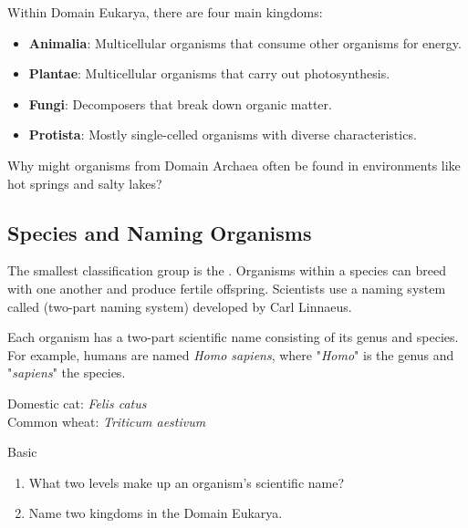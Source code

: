 Within Domain Eukarya, there are four main kingdoms:

\begin{itemize}
    \item \textbf{Animalia}: Multicellular organisms that consume other organisms for energy.
    \item \textbf{Plantae}: Multicellular organisms that carry out photosynthesis.
    \item \textbf{Fungi}: Decomposers that break down organic matter.
    \item \textbf{Protista}: Mostly single-celled organisms with diverse characteristics.
\end{itemize}


\begin{stopandthink}
Why might organisms from Domain Archaea often be found in environments like hot springs and salty lakes?
\end{stopandthink}

\subsection{Species and Naming Organisms}

The smallest classification group is the . Organisms within a species can breed with one another and produce fertile offspring. Scientists use a naming system called  (two-part naming system) developed by Carl Linnaeus.


Each organism has a two-part scientific name consisting of its genus and species. For example, humans are named \textit{Homo sapiens}, where "\textit{Homo}" is the genus and "\textit{sapiens}" the species.

\begin{example}
Domestic cat: \textit{Felis catus}\\
Common wheat: \textit{Triticum aestivum}
\end{example}

\begin{tieredquestions}{Basic}
\begin{enumerate}
\item What two levels make up an organism’s scientific name?
\item Name two kingdoms in the Domain Eukarya.
\end{enumerate}
\end{tieredquestions}

